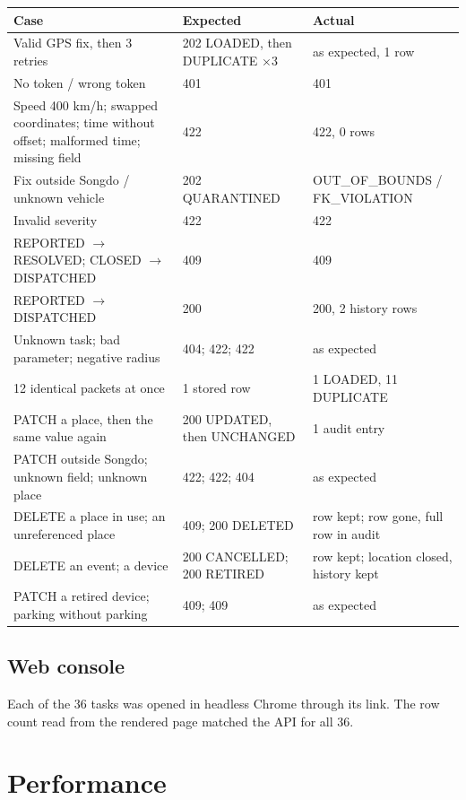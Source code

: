 \documentclass[11pt,a4paper]{article}
\newcommand{\ra}{\ensuremath{\rightarrow}}
\begin{document}
\begin{center}\small
\begin{tabularx}{\linewidth}{@{}Xp{4.2cm}p{4.2cm}@{}}
\toprule
Case & Expected & Actual \\
\midrule
Valid GPS fix, then 3 retries & 202 LOADED, then DUPLICATE $\times$3 & as expected, 1 row \\
No token / wrong token & 401 & 401 \\
Speed 400 km/h; swapped coordinates; time without offset; malformed time; missing field & 422 & 422, 0 rows \\
Fix outside Songdo / unknown vehicle & 202 QUARANTINED & OUT\_OF\_BOUNDS / FK\_VIOLATION \\
Invalid severity & 422 & 422 \\
REPORTED \ra{} RESOLVED; CLOSED \ra{} DISPATCHED & 409 & 409 \\
REPORTED \ra{} DISPATCHED & 200 & 200, 2 history rows \\
Unknown task; bad parameter; negative radius & 404; 422; 422 & as expected \\
12 identical packets at once & 1 stored row & 1 LOADED, 11 DUPLICATE \\
PATCH a place, then the same value again & 200 UPDATED, then UNCHANGED & 1 audit entry \\
PATCH outside Songdo; unknown field; unknown place & 422; 422; 404 & as expected \\
DELETE a place in use; an unreferenced place & 409; 200 DELETED & row kept; row gone, full row in audit \\
DELETE an event; a device & 200 CANCELLED; 200 RETIRED & row kept; location closed, history kept \\
PATCH a retired device; parking without parking & 409; 409 & as expected \\
\bottomrule
\end{tabularx}
\end{center}

\subsection{Web console}

Each of the 36 tasks was opened in headless Chrome through its link. The row count read
from the rendered page matched the API for all 36.

\section{Performance}\label{sec:perf}
\end{document}
